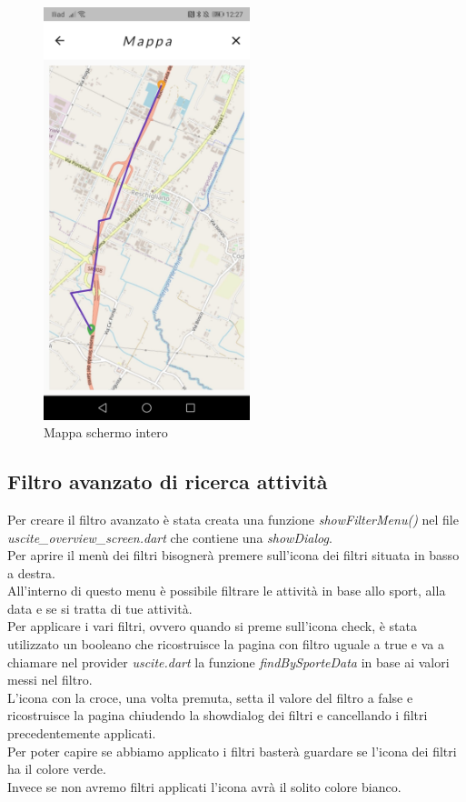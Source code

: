 \begin{figure}[htbp]	
	\centering
	\includegraphics[width=6cm]{immagini/mappaintero.jpeg}
	\caption{Mappa schermo intero}
	\label{fig:Mappa schermo intero}
\end{figure}

\newpage

\subsection{Filtro avanzato di ricerca attività}
Per creare il filtro avanzato è stata creata una funzione \textit{showFilterMenu()} nel file \textit{uscite\_overview\_screen.dart} che contiene una \textit{showDialog}.\\
Per aprire il menù dei filtri bisognerà premere sull'icona dei filtri situata in basso a destra.\\
All'interno di questo menu è possibile filtrare le attività in base allo sport, alla data e se si tratta di tue attività.\\
Per applicare i vari filtri, ovvero quando si preme sull'icona check, è stata utilizzato un booleano che ricostruisce la pagina  con filtro uguale a true e va a chiamare nel provider \textit{uscite.dart} la funzione \textit{findBySporteData} in base ai valori messi nel filtro.\\
L'icona con la croce, una volta premuta, setta il valore del filtro a false e ricostruisce la pagina chiudendo la showdialog dei filtri e cancellando i filtri precedentemente applicati.\\
Per poter capire se abbiamo applicato i filtri basterà guardare se l'icona dei filtri ha il colore verde.\\
Invece se non avremo filtri applicati l'icona avrà il solito colore bianco.\\

